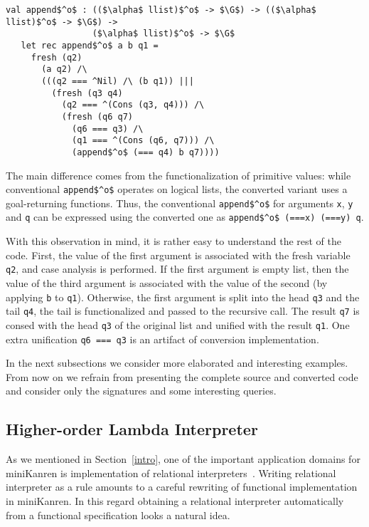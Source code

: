 \begin{lstlisting}[basicstyle=\small]
   val append$^o$ : (($\alpha$ llist)$^o$ -> $\G$) -> (($\alpha$ llist)$^o$ -> $\G$) -> 
                 ($\alpha$ llist)$^o$ -> $\G$
   let rec append$^o$ a b q1 =
     fresh (q2) 
       (a q2) /\
       (((q2 === ^Nil) /\ (b q1)) |||
         (fresh (q3 q4)
           (q2 === ^(Cons (q3, q4))) /\
           (fresh (q6 q7)
             (q6 === q3) /\             
             (q1 === ^(Cons (q6, q7))) /\
             (append$^o$ (=== q4) b q7))))
\end{lstlisting}

The main difference comes from the functionalization of primitive values: while conventional \lstinline|append$^o$| operates
on logical lists, the converted variant uses a goal-returning functions. Thus, the conventional \lstinline{append$^o$} for arguments
\lstinline|x|, \lstinline|y| and \lstinline|q| can be expressed using the converted one as \lstinline{append$^o$ (===x) (===y) q}.

With this observation in mind, it is rather easy to understand the rest of the code. First, the value of the first argument is
associated with the fresh variable \lstinline|q2|, and case analysis is performed. If the first argument is empty list, then the 
value of the third argument is associated with the value of the second (by applying \lstinline|b| to \lstinline|q1|). Otherwise, the first
argument is split into the head \lstinline|q3| and the tail \lstinline|q4|, the tail is functionalized and passed to the recursive
call. The result \lstinline|q7| is consed with the head \lstinline|q3| of the original list and unified with the result \lstinline|q1|. One extra
unification \lstinline|q6 === q3| is an artifact of conversion implementation.

In the next subsections we consider more elaborated and interesting examples. From now on we refrain from presenting the complete source and
converted code and consider only the signatures and some interesting queries. 

\subsection{Higher-order Lambda Interpreter}

As we mentioned in Section~\ref{intro}, one of the important application domains for miniKanren is implementation of relational interpreters~\cite{WillThesis,unified,Untagged}. 
Writing relational interpreter as a rule amounts to a careful rewriting of functional implementation in miniKanren. In this regard obtaining a relational
interpreter automatically from a functional specification looks a natural idea.

